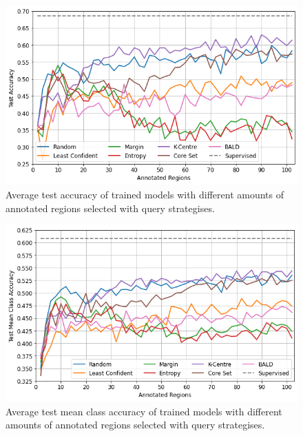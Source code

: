 \begin{figure}
	\centering
	\includegraphics[width=\textwidth]{images/active_learning_accuracy.png}
	\caption{Average test accuracy of trained models with different amounts of annotated regions selected with query strategises.}
	\label{fig:active_learning_accuracy}
\end{figure}

\begin{figure}
	\centering
	\includegraphics[width=\textwidth]{images/active_learning_mean_class_accuracy.png}
	\caption{Average test mean class accuracy of trained models with different amounts of annotated regions selected with query strategises.}
	\label{fig:active_learning_mean_class_accuracy}
\end{figure}


